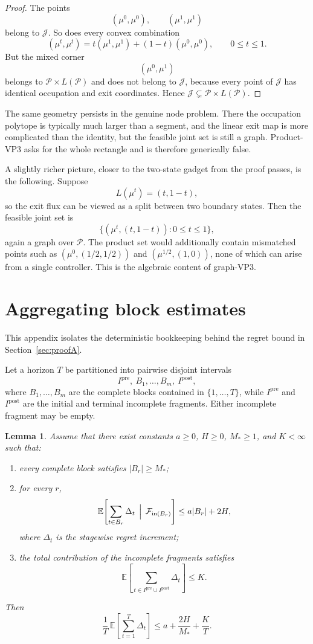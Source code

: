 \documentclass[12pt]{article}
\newtheorem{lemma}[theorem]{Lemma}
\theoremstyle{definition}
\newcommand{\E}{\mathbb{E}}
\newcommand{\1}{\mathbf{1}}
\newcommand{\cP}{\mathcal{P}}
\begin{document}
\begin{proof}
The points
\[
(\mu^0,\mu^0),\qquad (\mu^1,\mu^1)
\]
belong to \(\mathcal J\).  So does every convex combination
\[
(\mu^t,\mu^t)=t(\mu^1,\mu^1)+(1-t)(\mu^0,\mu^0),\qquad 0\le t\le 1.
\]
But the mixed corner
\[
(\mu^0,\mu^1)
\]
belongs to \(\cP\times L(\cP)\) and does not belong to \(\mathcal J\), because every point
of \(\mathcal J\) has identical occupation and exit coordinates.  Hence
\(\mathcal J\subsetneq \cP\times L(\cP)\).
\end{proof}

The same geometry persists in the genuine node problem.  There the occupation polytope is
typically much larger than a segment, and the linear exit map is more complicated than the
identity, but the feasible joint set is still a graph.  Product-VP3 asks for the whole
rectangle and is therefore generically false.

A slightly richer picture, closer to the two-state gadget from the proof passes, is the
following.  Suppose
\[
L(\mu^t)=(t,1-t),
\]
so the exit flux can be viewed as a split between two boundary states.  Then the feasible
joint set is
\[
\{(\mu^t,(t,1-t)):0\le t\le 1\},
\]
again a graph over \(\cP\).  The product set would additionally contain mismatched points
such as \((\mu^0,(1/2,1/2))\) and \((\mu^{1/2},(1,0))\), none of which can arise from a
single controller.  This is the algebraic content of graph-VP3.

\section{Aggregating block estimates}
\label{app:block-aggregation}

This appendix isolates the deterministic bookkeeping behind the regret bound in
Section~\ref{sec:proofA}.

Let a horizon \(T\) be partitioned into pairwise disjoint intervals
\[
I^{\mathrm{pre}},\ B_1,\dots,B_m,\ I^{\mathrm{post}},
\]
where \(B_1,\dots,B_m\) are the complete blocks contained in \(\{1,\dots,T\}\), while
\(I^{\mathrm{pre}}\) and \(I^{\mathrm{post}}\) are the initial and terminal incomplete
fragments.  Either incomplete fragment may be empty.

\begin{lemma}
\label{lem:aggregation}
Assume that there exist constants \(a\ge 0\), \(H\ge 0\), \(M_*\ge 1\), and \(K<\infty\)
such that:
\begin{enumerate}[label=\textnormal{(\roman*)},leftmargin=2.6em]
\item every complete block satisfies \(|B_r|\ge M_*\);
\item for every \(r\),
\[
\E\!\left[
\sum_{t\in B_r} \Delta_t \,\Bigm|\, \mathcal F_{\mathrm{in}(B_r)}
\right]
\le
a|B_r|+2H,
\]
where \(\Delta_t\) is the stagewise regret increment;
\item the total contribution of the incomplete fragments satisfies
\[
\E\!\left[\sum_{t\in I^{\mathrm{pre}}\cup I^{\mathrm{post}}}\Delta_t\right]\le K.
\]
\end{enumerate}
Then
\[
\frac1T\,\E\!\left[\sum_{t=1}^T \Delta_t\right]
\le
a+\frac{2H}{M_*}+\frac{K}{T}.
\]
\end{lemma}
\end{document}
